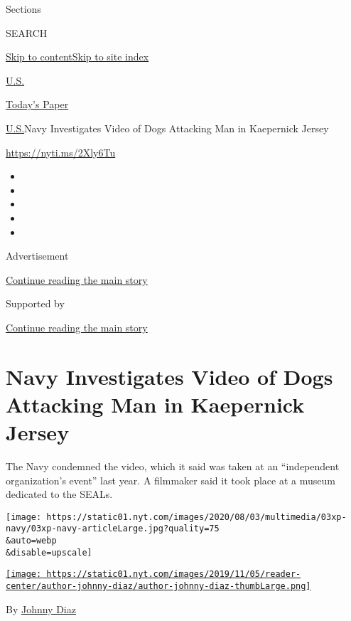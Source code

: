 Sections

SEARCH

\protect\hyperlink{site-content}{Skip to
content}\protect\hyperlink{site-index}{Skip to site index}

\href{https://www.nytimes.com/section/us}{U.S.}

\href{https://myaccount.nytimes.com/auth/login?response_type=cookie\&client_id=vi}{}

\href{https://www.nytimes.com/section/todayspaper}{Today's Paper}

\href{/section/us}{U.S.}\textbar{}Navy Investigates Video of Dogs
Attacking Man in Kaepernick Jersey

\url{https://nyti.ms/2Xly6Tu}

\begin{itemize}
\item
\item
\item
\item
\item
\end{itemize}

Advertisement

\protect\hyperlink{after-top}{Continue reading the main story}

Supported by

\protect\hyperlink{after-sponsor}{Continue reading the main story}

\hypertarget{navy-investigates-video-of-dogs-attacking-man-in-kaepernick-jersey}{%
\section{Navy Investigates Video of Dogs Attacking Man in Kaepernick
Jersey}\label{navy-investigates-video-of-dogs-attacking-man-in-kaepernick-jersey}}

The Navy condemned the video, which it said was taken at an
``independent organization's event'' last year. A filmmaker said it took
place at a museum dedicated to the SEALs.

\texttt{[image: https://static01.nyt.com/images/2020/08/03/multimedia/03xp-navy/03xp-navy-articleLarge.jpg?quality=75\\\&auto=webp\\\&disable=upscale]}

\href{https://www.nytimes.com/by/johnny-diaz}{\texttt{[image: https://static01.nyt.com/images/2019/11/05/reader-center/author-johnny-diaz/author-johnny-diaz-thumbLarge.png]}}

By \href{https://www.nytimes.com/by/johnny-diaz}{Johnny Diaz}

